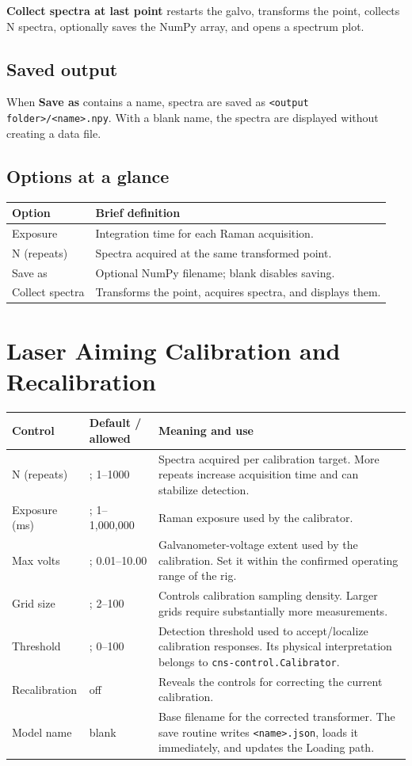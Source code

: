 \documentclass[11pt,oneside]{report}
\makeatletter
\newcommand{\ui}[1]{\textbf{#1}}
\newcommand{\code}[1]{\texttt{#1}}
\newcommand{\fieldtable}{\begin{longtable}{@{}>{\raggedright\arraybackslash}p{0.25\textwidth}>{\raggedright\arraybackslash}p{0.18\textwidth}>{\raggedright\arraybackslash}p{0.50\textwidth}@{}}\toprule\textbf{Control} & \textbf{Default / allowed} & \textbf{Meaning and use}\\\midrule\endhead}
\newcommand{\endfieldtable}{\bottomrule\end{longtable}}
\makeatother
\begin{document}
\ui{Collect spectra at last point} restarts the galvo, transforms the point,
collects N spectra, optionally saves the NumPy array, and opens a spectrum plot.

\section*{Saved output}
When \ui{Save as} contains a name, spectra are saved as
\code{<output folder>/<name>.npy}. With a blank name, the spectra are displayed
without creating a data file.

\section*{Options at a glance}
\begin{longtable}{@{}p{}p{}@{}}
\toprule\textbf{Option} & \textbf{Brief definition}\\\midrule
Exposure & Integration time for each Raman acquisition.\\
N (repeats) & Spectra acquired at the same transformed point.\\
Save as & Optional NumPy filename; blank disables saving.\\
Collect spectra & Transforms the point, acquires spectra, and displays them.\\
\bottomrule\end{longtable}

\chapter{Laser Aiming Calibration and Recalibration}

\fieldtable
N (repeats) & 20; 1--1000 & Spectra acquired per calibration target. More repeats
increase acquisition time and can stabilize detection.\\
Exposure (ms) & 1000; 1--1,000,000 & Raman exposure used by the calibrator.\\
Max volts & 1.80; 0.01--10.00 & Galvanometer-voltage extent used by the
calibration. Set it within the confirmed operating range of the rig.\\
Grid size & 10; 2--100 & Controls calibration
sampling density. Larger grids require substantially more measurements.\\
Threshold & 1.00; 0--100 & Detection threshold used to accept/localize calibration
responses. Its physical interpretation belongs to \code{cns-control.Calibrator}.\\
Recalibration & off & Reveals the controls for correcting the current calibration.\\
Model name & blank & Base filename for the corrected transformer. The save routine
writes \code{<name>.json}, loads it immediately, and updates the Loading path.\\
\endfieldtable
\end{document}
